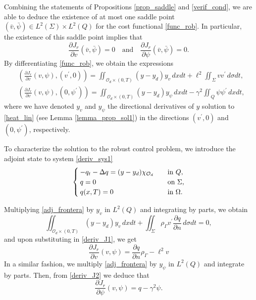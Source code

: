 \documentclass[preprint,10pt]{article}
\numberwithin{equation}{section}
\numberwithin{theorem}{section}
\def\csbd{\rho_{\Gamma}}
\begin{document}
{Combining the statements of Propositions \ref{prop_saddle} and \ref{verif_cond}, we are able to deduce the existence of at most one saddle point $(\bar v,\bar \psi)\in L^2(\Sigma)\times L^2(Q)$ for the cost functional \eqref{func_rob}. In particular, the existence of this saddle point implies that 
%
\begin{equation*}
\frac{\partial J_r}{\partial v}(\bar v,\bar \psi)=0 \quad \text{and}\quad \frac{\partial J_r}{\partial \psi}(\bar v,\bar \psi)=0.
\end{equation*}
%
By differentiating \eqref{func_rob}, we obtain the expressions 
%
\begin{align}\label{deriv_J1}
&\left(\frac{\partial J_r}{\partial v}(v,\psi),(v^\prime,0)\right)=\iint_{\mathcal O_d\times(0,T)}(y-y_d)y_v\,dxdt+\ell^2\iint_{\Sigma}vv^\prime\,d\sigma dt, \\ \label{deriv_J2}
&\left(\frac{\partial J_r}{\partial v}(v,\psi),(0,\psi^\prime)\right)=\iint_{\mathcal O_d\times(0,T)}(y-y_d)y_\psi\,dxdt-\gamma^2\iint_{Q}\psi\psi^\prime\,dxdt,
\end{align}
%
where we have denoted $y_v$ and $y_\psi$ the directional derivatives of $y$ solution to \eqref{heat_lin} (see Lemma \ref{lemma_prop_sol1}) in the directions $(v^\prime,0)$ and $(0,\psi^\prime)$, respectively. 

To characterize the solution to the robust control problem, we introduce the adjoint state to system \eqref{deriv_sys1}
%
\begin{equation}\label{adj_frontera}
\begin{cases}
-q_t-\Delta q=(y-y_d)\chi_{\mathcal O_d} \quad& \text{in }Q, \\
q=0 \quad &\textnormal{on $\Sigma$,} \\
q(x,T)=0 \quad &\textnormal{in $\Omega$}.
\end{cases}
\end{equation}

Multiplying \eqref{adj_frontera} by $y_v$ in $L^2(Q)$ and integrating by parts, we obtain  
%
\begin{equation*}
\iint_{\mathcal O_d\times(0,T)}(y-y_d)y_v\,dxdt+\iint_{\Sigma}\csbd v^\prime\frac{\partial q}{\partial n}\,d\sigma dt=0,
\end{equation*}
%
and upon substituting in \eqref{deriv_J1}, we get 
%
\begin{equation*}
\frac{\partial J_r}{\partial v}(v,\psi)=\frac{\partial q}{\partial n}\csbd-\ell^2v  
\end{equation*}
%
In a similar fashion, we multiply \eqref{adj_frontera} by $y_\psi$ in $L^2(Q)$ and integrate by parts. Then, from \eqref{deriv_J2} we deduce that 
%
\begin{equation*}
\frac{\partial J_r}{\partial \psi}(v,\psi)=q-\gamma^2\psi. 
\end{equation*}

}
\end{document}

